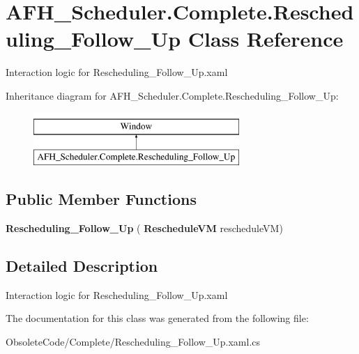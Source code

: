 \section{A\+F\+H\+\_\+\+Scheduler.\+Complete.\+Rescheduling\+\_\+\+Follow\+\_\+\+Up Class Reference}
\label{class_a_f_h___scheduler_1_1_complete_1_1_rescheduling___follow___up}


Interaction logic for Rescheduling\+\_\+\+Follow\+\_\+\+Up.\+xaml  


Inheritance diagram for A\+F\+H\+\_\+\+Scheduler.\+Complete.\+Rescheduling\+\_\+\+Follow\+\_\+\+Up\+:\begin{figure}[H]
\begin{center}
\leavevmode
\includegraphics[height=2.000000cm]{class_a_f_h___scheduler_1_1_complete_1_1_rescheduling___follow___up}
\end{center}
\end{figure}
\subsection*{Public Member Functions}
\begin{DoxyCompactItemize}
\item 
\mbox{\label{class_a_f_h___scheduler_1_1_complete_1_1_rescheduling___follow___up_a11c8a5f1511808230f631d8f727bfb50}} 
{\bfseries Rescheduling\+\_\+\+Follow\+\_\+\+Up} (\textbf{ Reschedule\+VM} reschedule\+VM)
\end{DoxyCompactItemize}


\subsection{Detailed Description}
Interaction logic for Rescheduling\+\_\+\+Follow\+\_\+\+Up.\+xaml 



The documentation for this class was generated from the following file\+:\begin{DoxyCompactItemize}
\item 
Obsolete\+Code/\+Complete/Rescheduling\+\_\+\+Follow\+\_\+\+Up.\+xaml.\+cs\end{DoxyCompactItemize}
